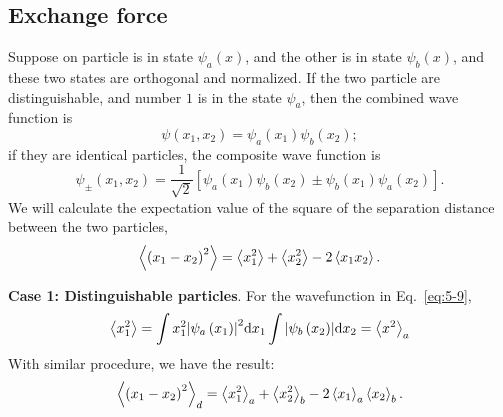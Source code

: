 \subsection{Exchange force}
Suppose on particle is in state $\psi_a \left( x \right)$, and the other is in state $\psi_b \left( x \right)$, and these two states are orthogonal and normalized.
If the two particle are distinguishable, and number $1$ is in the state $\psi_a$, then the combined wave function is
\begin{equation}
  \label{eq:5-9}
  \psi \left( x_1,x_2 \right) = \psi_a \left( x_1 \right) \psi_b \left( x_2 \right);
\end{equation}
if they are identical particles, the composite wave function is
\begin{equation}
  \label{eq:5-10}
 \psi_{\pm} \left( x_1,x_2 \right) = \frac{1}{\sqrt{2}} \left[ \psi_a \left( x_1 \right) \psi_b \left( x_2 \right) \pm \psi_b \left( x_1 \right) \psi_a \left( x_2 \right) \right].
\end{equation}
We will calculate the expectation value of the square of the separation distance between the two particles,
\begin{equation}
  \label{eq:5-11}
 \expval{\left( x_1 - x_2 \right)^2} = \expval{x_1^2} + \expval{x_2^2} - 2\expval{x_1x_2}.
\end{equation}

\textbf{Case 1: Distinguishable particles}. For the wavefunction in Eq.~\eqref{eq:5-9},
\begin{equation*}
  \expval{ x_1^2 } = \int x_1^2 \abs{ \psi_a \left( x_1 \right) }^2 \dd x_1 \int \abs{\psi_b \left( x_2 \right)} \dd x_{2} = \expval{x^2}_{a}
\end{equation*}
With similar procedure, we have the result:
\begin{equation}
  \label{eq:5-12}
   \expval{\left( x_1 - x_2 \right)^2}_d = \expval{x_1^2}_a + \expval{x_2^2}_b - 2\expval{x_1}_a\expval{x_2}_b.
\end{equation}

